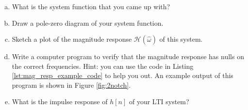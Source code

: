 \begin{enumerate}
  \begin{enumerate}[a)] \item What is the system function that you
  came up with?  \item Draw a pole-zero diagram of your system
  function.  \item Sketch a plot of the magnitude response
  $\mathcal{H}(\hat{\omega})$ of this system.  \item Write a computer
  program to verify that the magnitude response has nulls on the
  correct frequencies. Hint: you can use the code in
  Listing \ref{lst:mag_resp_example_code} to help you out. An example
  output of this program is shown in Figure \ref{fig:2notch}.  \item
  What is the impulse response of $h[n]$ of your LTI
  system?  \end{enumerate}

  \end{enumerate}

